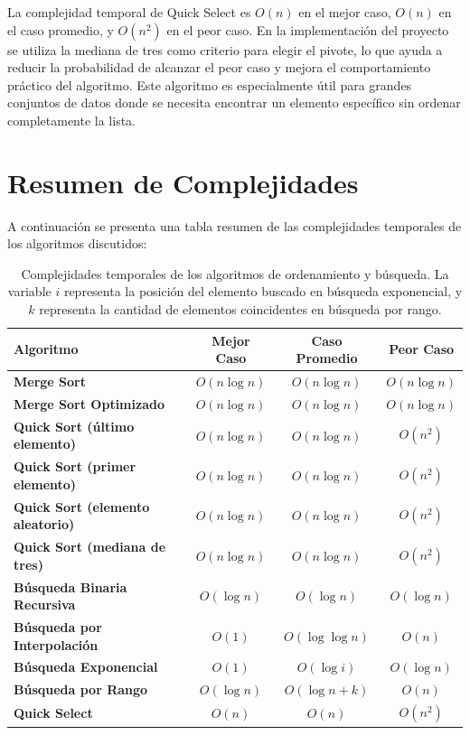 La complejidad temporal de Quick Select es \(O(n)\) en el mejor caso, \(O(n)\) en el caso promedio, y \(O(n^2)\) en el peor caso. En la implementación del proyecto se utiliza la mediana de tres como criterio para elegir el pivote, lo que ayuda a reducir la probabilidad de alcanzar el peor caso y mejora el comportamiento práctico del algoritmo. Este algoritmo es especialmente útil para grandes conjuntos de datos donde se necesita encontrar un elemento específico sin ordenar completamente la lista.

\section{Resumen de Complejidades}
A continuación se presenta una tabla resumen de las complejidades temporales de los algoritmos discutidos:

\begin{table}[h]
\centering
\begin{tabular}{|l|c|c|c|}
\hline
\textbf{Algoritmo} & \textbf{Mejor Caso} & \textbf{Caso Promedio} & \textbf{Peor Caso} \\
\hline
\textbf{Merge Sort} & $O(n \log n)$ & $O(n \log n)$ & $O(n \log n)$ \\
\hline
\textbf{Merge Sort Optimizado} & $O(n \log n)$ & $O(n \log n)$ & $O(n \log n)$ \\
\hline
\textbf{Quick Sort (último elemento)} & $O(n \log n)$ & $O(n \log n)$ & $O(n^2)$ \\
\hline
\textbf{Quick Sort (primer elemento)} & $O(n \log n)$ & $O(n \log n)$ & $O(n^2)$ \\
\hline
\textbf{Quick Sort (elemento aleatorio)} & $O(n \log n)$ & $O(n \log n)$ & $O(n^2)$ \\
\hline
\textbf{Quick Sort (mediana de tres)} & $O(n \log n)$ & $O(n \log n)$ & $O(n^2)$ \\
\hline
\textbf{Búsqueda Binaria Recursiva} & $O(\log n)$ & $O(\log n)$ & $O(\log n)$ \\
\hline
\textbf{Búsqueda por Interpolación} & $O(1)$ & $O(\log \log n)$ & $O(n)$ \\
\hline
\textbf{Búsqueda Exponencial} & $O(1)$ & $O(\log i)$ & $O(\log n)$ \\
\hline
\textbf{Búsqueda por Rango} & $O(\log n)$ & $O(\log n + k)$ & $O(n)$ \\
\hline
\textbf{Quick Select} & $O(n)$ & $O(n)$ & $O(n^2)$ \\
\hline
\end{tabular}
\caption{Complejidades temporales de los algoritmos de ordenamiento y búsqueda. La variable $i$ representa la posición del elemento buscado en búsqueda exponencial, y $k$ representa la cantidad de elementos coincidentes en búsqueda por rango.}
\label{tab:complejidades}
\end{table}
